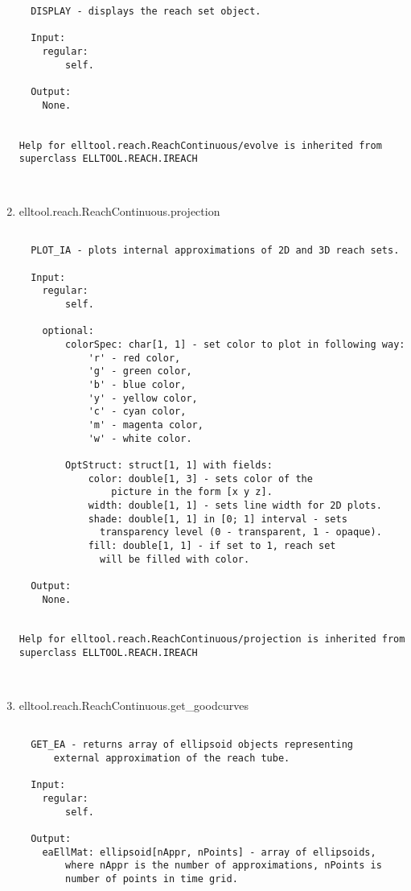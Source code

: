 \begin{enumerate}
\begin{lstlisting}
  DISPLAY - displays the reach set object.

  Input:
    regular:
        self.

  Output:
    None.


Help for elltool.reach.ReachContinuous/evolve is inherited from superclass ELLTOOL.REACH.IREACH



\end{lstlisting}
\fontfamily{\familydefault}
\selectfont
\item {elltool.reach.ReachContinuous.projection}
\selectfont
\begin{lstlisting}

  PLOT_IA - plots internal approximations of 2D and 3D reach sets.

  Input:
    regular:
        self.

    optional:
        colorSpec: char[1, 1] - set color to plot in following way:
            'r' - red color,
            'g' - green color,
            'b' - blue color,
            'y' - yellow color,
            'c' - cyan color,
            'm' - magenta color,
            'w' - white color.

        OptStruct: struct[1, 1] with fields:
            color: double[1, 3] - sets color of the
                picture in the form [x y z].
            width: double[1, 1] - sets line width for 2D plots.
            shade: double[1, 1] in [0; 1] interval - sets
              transparency level (0 - transparent, 1 - opaque).
            fill: double[1, 1] - if set to 1, reach set
              will be filled with color.

  Output:
    None.


Help for elltool.reach.ReachContinuous/projection is inherited from superclass ELLTOOL.REACH.IREACH



\end{lstlisting}
\fontfamily{\familydefault}
\selectfont
\item {elltool.reach.ReachContinuous.get\_goodcurves}
\selectfont
\begin{lstlisting}

  GET_EA - returns array of ellipsoid objects representing
      external approximation of the reach tube.

  Input:
    regular:
        self.

  Output:
    eaEllMat: ellipsoid[nAppr, nPoints] - array of ellipsoids,
        where nAppr is the number of approximations, nPoints is
        number of points in time grid.


\end{lstlisting}
\end{enumerate}
